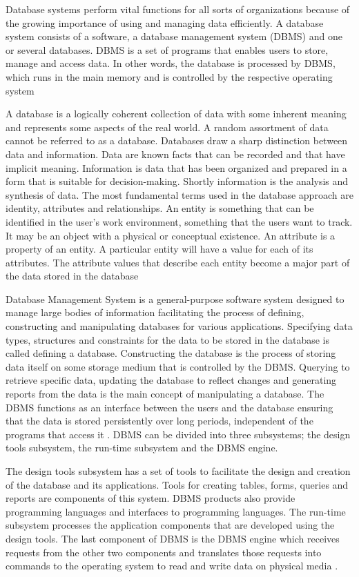 Database systems perform vital functions for all sorts of organizations
because of the growing importance of using and managing data efficiently. A
database system consists of a software, a database management system (DBMS)
and one or several databases. DBMS is a set of programs that enables users to
store, manage and access data. In other words, the database is processed by DBMS,
which runs in the main memory and is controlled by the respective operating
system

A database is a logically coherent collection of data with some inherent
meaning and represents some aspects of the real world. A random assortment of
data cannot be referred to as a database. Databases draw a sharp distinction
between data and information. Data are known facts that can be recorded and that
have implicit meaning. Information is data that has been organized and prepared
in a form that is suitable for decision-making. Shortly information is the analysis
and synthesis of data.
The most fundamental terms used in the database approach are identity,
attributes and relationships. An entity is something that can be identified in the
user's work environment, something that the users want to track. It may be an
object with a physical or conceptual existence. An attribute is a property of an
entity. A particular entity will have a value for each of its attributes. The attribute
values that describe each entity become a major part of the data stored in the database

Database Management System is a general-purpose software system
designed to manage large bodies of information facilitating the process of
defining, constructing and manipulating databases for various applications.
Specifying data types, structures and constraints for the data to be stored in the
database is called defining a database. Constructing the database is the process of
storing data itself on some storage medium that is controlled by the DBMS.
Querying to retrieve specific data, updating the database to reflect changes and
generating reports from the data is the main concept of manipulating a database.
The DBMS functions as an interface between the users and the database
ensuring that the data is stored persistently over long periods, independent
of the programs that access it \cite{latisen1998}.
DBMS can be divided into three subsystems; the design tools subsystem,
the run-time subsystem and the DBMS engine.

The design tools subsystem has a set of tools to facilitate the design and
creation of the database and its applications. Tools for creating tables, forms,
queries and reports are components of this system. DBMS products also provide
programming languages and interfaces to programming languages. The run-time
subsystem processes the application components that are developed using the
design tools. The last component of DBMS is the DBMS engine which receives
requests from the other two components and translates those requests into
commands to the operating system to read and write data on physical media \cite{elmasri1998}.


